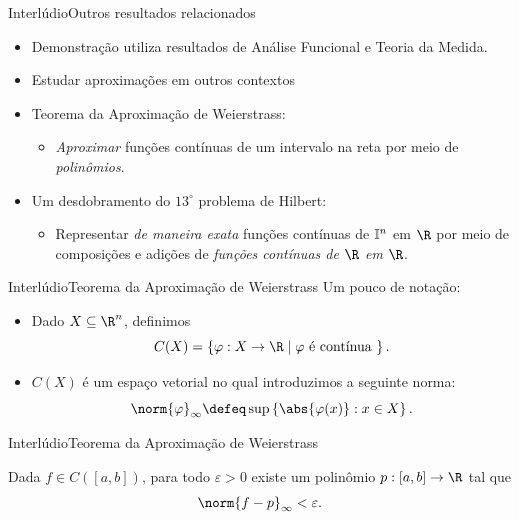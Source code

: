 \documentclass[13pt]{beamer}
\begin{document}
\begin{frame}{Interlúdio}{Outros resultados relacionados}
    \begin{itemize}
        \item<1-> Demonstração utiliza resultados de Análise Funcional e Teoria da Medida.
        \item<2-> Estudar aproximações em outros contextos
        \item<3-> Teorema da Aproximação de Weierstrass:
            \begin{itemize}
                \item<4-> \emph{Aproximar} funções contínuas de um intervalo na reta por meio de \emph{polinômios}.
            \end{itemize}
        \item<5-> Um desdobramento do \( 13^{ \circ } \) problema de Hilbert:
            \begin{itemize}
                \item<6-> Representar \emph{de maneira exata} funções contínuas de \( \mathbb{I}^{ n } \) em \( \R \) por meio de composições e adições de \emph{funções contínuas de \( \R \) em \( \R \)}.
            \end{itemize}
    \end{itemize}
\end{frame}

\begin{frame}{Interlúdio}{Teorema da Aproximação de Weierstrass}
    Um pouco de notação:
    \begin{itemize}
        \item Dado \( X \subseteq \R^{ n } \), definimos
            \begin{equation*}
                C ( X ) = \left\{ \varphi : X \to \R \mid \varphi \text{ é contínua } \right\}
            .\end{equation*}
        \item \( C ( X ) \) é um espaço vetorial no qual introduzimos a seguinte norma:
            \begin{equation*}
                \norm{ \varphi }_{ \infty } \defeq \sup \left\{ \abs{ \varphi ( x ) } : x \in X \right\}
            .\end{equation*}
    \end{itemize}
\end{frame}

\begin{frame}{Interlúdio}{Teorema da Aproximação de Weierstrass}
    \begin{teo*}
        Dada \( f \in C ( [a, b] ) \), para todo \( \varepsilon > 0 \) existe um polinômio \( p : [a, b] \to \R \) tal que
        \begin{equation*}
            \norm{ f - p }_{ \infty } < \varepsilon
        .\end{equation*}
    \end{teo*}
\end{frame}
\end{document}
